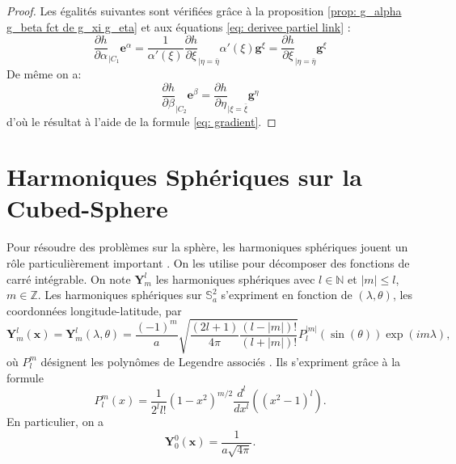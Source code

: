\begin{proof}
Les égalités suivantes sont vérifiées grâce à la proposition \ref{prop: g_alpha g_beta fct de g_xi g_eta} et aux équations \eqref{eq: derivee partiel link} :
\begin{equation}
\dfrac{\partial h}{\partial \alpha}_{|C_1} \mathbf{e}^{\alpha} = \dfrac{1}{\alpha'(\xi)} \dfrac{\partial h}{\partial \xi}_{|\eta = \bar{\eta}} \alpha'(\xi) \mathbf{g}^{\xi} = \dfrac{\partial h}{\partial \xi}_{|\eta = \bar{\eta}} \mathbf{g}^{\xi}
\end{equation}
De même on a:
\begin{equation}
\dfrac{\partial h}{\partial \beta}_{|C_2} \mathbf{e}^{\beta} =  \dfrac{\partial h}{\partial \eta}_{|\xi = \bar{\xi}} \mathbf{g}^{\eta}
\end{equation}
d'où le résultat à l'aide de la formule \eqref{eq: gradient}.
\end{proof}































\section{Harmoniques Sphériques sur la Cubed-Sphere}

Pour résoudre des problèmes sur la sphère, les harmoniques sphériques jouent un rôle particulièrement important \cite{Atkinson2012, Frye2012}. On les utilise pour décomposer des fonctions de carré intégrable. On note $\mathbf{Y}^l_m$ les harmoniques sphériques avec $l \in \mathbb{N}$ et $|m| \leq l$, $m \in \mathbb{Z}$. Les harmoniques sphériques sur $\mathbb{S}_a^2$ s'expriment en fonction de $(\lambda, \theta)$, les coordonnées longitude-latitude, par
\begin{equation}
\mathbf{Y}_m^l(\mathbf{x}) = \mathbf{Y}_m^l(\lambda, \theta) = \dfrac{(-1)^m}{a} \sqrt{\dfrac{(2l+1)}{4 \pi} \dfrac{(l-|m|)!}{(l+|m|)!}} P^{|m|}_l (\sin (\theta)) \exp \left( i m \lambda \right),
\label{eq:harmoniques_spheriques}
\end{equation}
où $P^m_l$ désignent les polynômes de Legendre associés \cite{Atkinson2012, Lagrange1939}. Ils s'expriment grâce à la formule
\begin{equation}
P^m_l(x) = \dfrac{1}{2^l l!}(1-x^2)^{m/2} \dfrac{d^l}{dx^l} \left( (x^2-1)^l \right).
\end{equation}
En particulier, on a 
\begin{equation}
\mathbf{Y}_0^0(\mathbf{x}) = \dfrac{1}{a \sqrt{4 \pi}}.
\end{equation}


